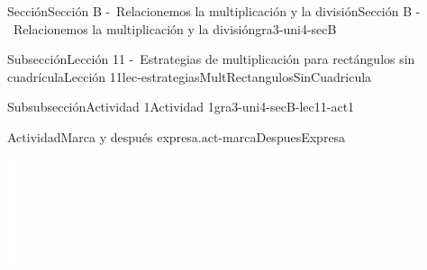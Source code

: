 \begin{sectionptx}{Sección}{Sección B -~Relacionemos la multiplicación y la división}{}{Sección B -~Relacionemos la multiplicación y la división}{}{}{gra3-uni4-secB}
\begin{subsectionptx}{Subsección}{Lección 11 -~Estrategias de multiplicación para rectángulos sin cuadrícula}{}{Lección 11}{}{}{lec-estrategiasMultRectangulosSinCuadricula}
\begin{subsubsectionptx}{Subsubsección}{Actividad 1}{}{Actividad 1}{}{}{gra3-uni4-secB-lec11-act1}
\begin{activity}{Actividad}{Marca y después expresa.}{act-marcaDespuesExpresa}
\begin{image}{0}{1}{0}{}
\includegraphics[max width=\linewidth, center]{external/whitespace-tikz/2cm.pdf}

\end{image}
\end{activity}
\end{subsubsectionptx}
\end{subsectionptx}
\end{sectionptx}
